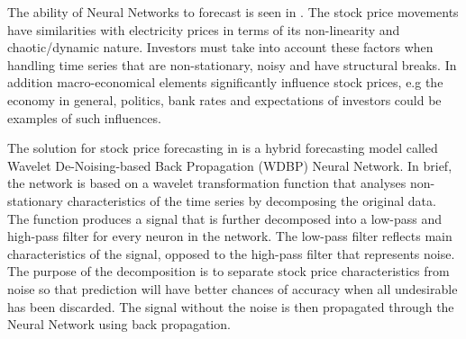 The ability of Neural Networks to forecast is seen in \cite{stockForecasting}. The stock price movements have similarities with electricity prices in terms of its non-linearity and chaotic/dynamic nature. Investors must take into account these factors when handling time series that are non-stationary, noisy and have structural breaks. In addition macro-economical elements significantly influence stock prices, e.g the economy in general, politics, bank rates and expectations of investors could be examples of such influences.

The solution for stock price forecasting in \cite{stockForecasting} is a hybrid forecasting model called Wavelet De-Noising-based Back Propagation (WDBP) Neural Network. In brief, the network is based on a wavelet transformation function that analyses non-stationary characteristics of the time series by decomposing the original data. The function produces a signal that is further decomposed into a low-pass and high-pass filter for every neuron in the network. The low-pass filter reflects main characteristics of the signal, opposed to the high-pass filter that represents noise. The purpose of the decomposition is to separate stock price characteristics from noise so that prediction will have better chances of accuracy when all undesirable has been discarded. The signal without the noise is then propagated through the Neural Network using back propagation.
